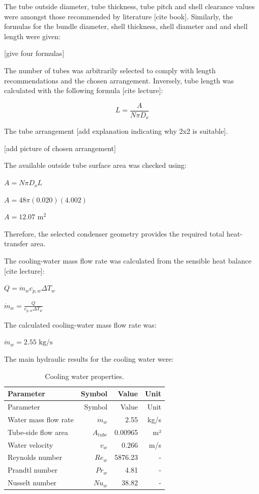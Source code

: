 The tube outside diameter, tube thickness, tube pitch and shell
clearance values were amongst those recommended by literature {[}cite
book{]}. Similarly, the formulas for the bundle diameter, shell
thickness, shell diameter and and shell length were given:

{[}give four formulas{]}

The number of tubes was arbitrarily selected to comply with length
recommendations and the chosen arrangement. Inversely, tube length was
calculated with the following formula {[}cite lecture{]}:

\begin{equation}{L = \frac{A}{N \pi D_o}}\end{equation}

The tube arrangement {[}add explanation indicating why 2x2 is
suitable{]}.

{[}add picture of chosen arrangement{]}

The available outside tube surface area was checked using:

\(A = N \pi D_o L\)

\(A = 48 \pi (0.020)(4.002)\)

\(A = 12.07 \text{ m}^2\)

Therefore, the selected condenser geometry provides the required total
heat-transfer area.

The cooling-water mass flow rate was calculated from the sensible heat
balance {[}cite lecture{]}:

\(Q = \dot{m}_w c_{p,w} \Delta T_w\)

\(\dot{m}_w = \frac{Q}{c_{p,w} \Delta T_w}\)

The calculated cooling-water mass flow rate was:

\(\dot{m}_w = 2.55 \text{ kg/s}\)

The main hydraulic results for the cooling water were:

\begin{longtable}[]{@{}lrrr@{}}
\caption{Cooling water properties.
\label{tab:Cooling water properties}}\tabularnewline
\toprule\noalign{}
Parameter & Symbol & Value & Unit \\
\midrule\noalign{}
\endfirsthead
\toprule\noalign{}
Parameter & Symbol & Value & Unit \\
\midrule\noalign{}
\endhead
\bottomrule\noalign{}
\endlastfoot
Water mass flow rate & \(\dot{m}_w\) & 2.55 & kg/s \\
Tube-side flow area & \(A_{tube}\) & 0.00965 & m² \\
Water velocity & \(v_w\) & 0.266 & m/s \\
Reynolds number & \(Re_w\) & 5876.23 & - \\
Prandtl number & \(Pr_w\) & 4.81 & - \\
Nusselt number & \(Nu_w\) & 38.82 & - \\
\end{longtable}

